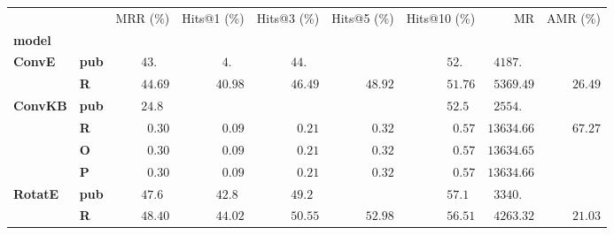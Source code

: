 \begin{tabular}{llrrrrrrr}
\toprule
       &   &           MRR (\%) &                  Hits@1 (\%) &        Hits@3 (\%) &        Hits@5 (\%) &       Hits@10 (\%) &                              MR & AMR (\%) \\
\textbf{model} & {} &                    &                              &                    &                    &                    &                                 &          \\
\midrule
\textbf{ConvE} & \textbf{pub} &  $43.\phantom{00}$ &  $\phantom{0}4.\phantom{00}$ &  $44.\phantom{00}$ &                    &  $52.\phantom{00}$ &  $\phantom{0}4187.\phantom{00}$ &          \\
       & \textbf{R} &            $44.69$ &                      $40.98$ &            $46.49$ &            $48.92$ &            $51.76$ &            $\phantom{0}5369.49$ &  $26.49$ \\\midrule
\textbf{ConvKB} & \textbf{pub} &  $24.8\phantom{0}$ &                              &                    &                    &  $52.5\phantom{0}$ &  $\phantom{0}2554.\phantom{00}$ &          \\
       & \textbf{R} &  $\phantom{0}0.30$ &            $\phantom{0}0.09$ &  $\phantom{0}0.21$ &  $\phantom{0}0.32$ &  $\phantom{0}0.57$ &                      $13634.66$ &  $67.27$ \\
       & \textbf{O} &  $\phantom{0}0.30$ &            $\phantom{0}0.09$ &  $\phantom{0}0.21$ &  $\phantom{0}0.32$ &  $\phantom{0}0.57$ &                      $13634.65$ &          \\
       & \textbf{P} &  $\phantom{0}0.30$ &            $\phantom{0}0.09$ &  $\phantom{0}0.21$ &  $\phantom{0}0.32$ &  $\phantom{0}0.57$ &                      $13634.66$ &          \\\midrule
\textbf{RotatE} & \textbf{pub} &  $47.6\phantom{0}$ &            $42.8\phantom{0}$ &  $49.2\phantom{0}$ &                    &  $57.1\phantom{0}$ &  $\phantom{0}3340.\phantom{00}$ &          \\
       & \textbf{R} &            $48.40$ &                      $44.02$ &            $50.55$ &            $52.98$ &            $56.51$ &            $\phantom{0}4263.32$ &  $21.03$ \\
\bottomrule
\end{tabular}

